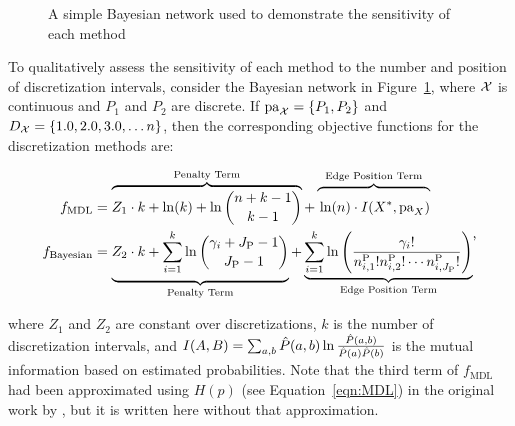 \begin{figure}[ht]
  \centering
  
  \caption{A simple Bayesian network used to demonstrate the sensitivity of each method}
  \label{fig:exp_discuss}
\end{figure}

To qualitatively assess the sensitivity of each method to the number and position of discretization intervals, consider the Bayesian network in Figure~\ref{fig:exp_discuss}, where $\mathcal{X}$ is continuous and $P_1$ and $P_2$ are discrete.
If $\Pa_{\cX} = \curly{P_1, P_2}$ and $D_{\cX} = \curly{1.0,2.0,3.0, \ldots n}$, then the corresponding objective functions for the discretization methods are:

\begin{small}
  \begin{equation}
  \begin{aligned}
  f_{\text{MDL}} & = \overbrace{Z_1 \cdot k + \ln(k) + \ln {{n +k - 1}\choose{k -1}} }^{\text{Penalty Term}}+   \overbrace{\rule{0pt}{1.35em} \ln(n) \cdot I(X^*, \Pa_X)}^{\text{Edge Position Term}} \\
  f_{\text{Bayesian}} &= \underbrace{{\vrule width0pt height0pt depth1.48em\relax}  Z_2 \cdot k + \sum_{i=1}^k \ln {{\gamma_i + J_\text{P} - 1}\choose{J_\text{P} -1}}}_{\text{Penalty Term}} + \underbrace{\sum^k_{i=1} \ln \left(   {{\gamma_i !}\over{n^{\text{P}}_{i,1}! n^{\text{P}}_{i,2}! \cdots n^{\text{P}}_{i,J_\text{P}}!    }} \right) }_{\text{Edge Position Term}}
  \end{aligned}\text{,}
  \end{equation}
\end{small}

\noindent
where $Z_1$ and $Z_2$ are constant over discretizations, $k$ is the number of discretization intervals, and $I\paren{A, B} = \sum_{a,b} \hat{P}(a,b) \ln\frac{\hat{P}(a,b)}{\hat{P}(a)\hat{P}(b)}$ is the mutual information based on estimated probabilities.
Note that the third term of $f_\text{MDL}$ had been approximated using $H(p)$ (see Equation~\ref{eqn:MDL}) in the original work by \cite{Friedman_1996}, but it is written here without that approximation.

